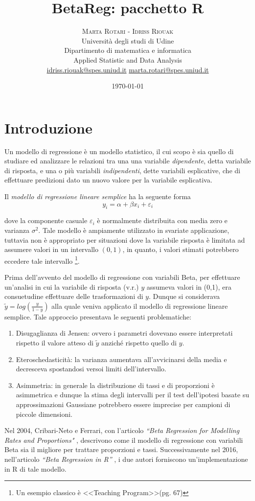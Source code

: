 \documentclass[twoside,twocolumn]{article}
\title{BetaReg: pacchetto R}
\author{
	\textsc{Marta Rotari - Idriss Riouak} \\[1ex] 
	\normalsize Università degli studi di Udine \\ 
	\normalsize Dipartimento di matematica e informatica \\ 
	\normalsize Applied Statistic and Data Analysis\\
	\normalsize \href{mailto:idriss.riouak@spes.uniud.it}{idriss.riouak@spes.uniud.it} 
	\normalsize \href{mailto:marta.rotari@spes.uniud.it}{marta.rotari@spes.uniud.it} 
}
\date{\today}
\begin{document}
	

	\maketitle
	
	\section{Introduzione}
	Un modello di regressione è un modello statistico, il cui scopo è sia quello di studiare ed analizzare le relazioni tra una una variabile \emph{dipendente}, detta variabile di risposta, e una o più variabili \emph{indipendenti}, dette variabili esplicative, che di effettuare predizioni dato un nuovo valore per la variabile esplicativa.
	
	Il \emph{modello di regressione lineare semplice} ha la seguente forma
	\begin{equation}\label{eq:lrm}
		 y_i=\alpha + \beta x_i + \varepsilon_i 
	\end{equation}

	dove la componente casuale $\varepsilon_i$ è normalmente distribuita con media zero e varianza $\sigma^2$.
	Tale modello è ampiamente utilizzato in svariate applicazione, tuttavia non è appropriato per situazioni dove la variabile risposta è limitata ad assumere valori in un intervallo $(0,1)$, in quanto, i valori stimati potrebbero eccedere tale intervallo \footnote{Un esempio classico è <<Teaching Program>>\cite{PV}(pg. 67)}. 
	
	Prima dell'avvento del modello di regressione con variabili Beta, per effettuare un'analisi in cui la variabile di risposta (v.r.) $y$ assumeva valori in (0,1), era consuetudine effettuare delle trasformazioni di $y$. Dunque si considerava $\tilde{y}=log(\frac{y}{1-y})$ alla quale veniva applicato il modello di regressione lineare semplice. Tale approccio presentava le seguenti problematiche:
	\begin{enumerate}[label=\Roman*]
		\item Disugaglianza di Jensen: ovvero i parametri dovevano essere interpretati rispetto il valore atteso di $\tilde{y}$ anziché rispetto quello di $y$.
		\item Eteroschedasticità: la varianza aumentava all'avvicinarsi della media e decresceva spostandosi versoi limiti dell'intervallo.
		\item Asimmetria: in generale la distribuzione di tassi e di proporzioni è asimmetrica e dunque la stima degli intervalli per il test dell'ipotesi basate su approssimazioni Gaussiane potrebbero essere imprecise per campioni di piccole dimensioni.
	\end{enumerate}
	Nel 2004, Cribari-Neto e Ferrari, con l'articolo \emph{``Beta Regression for Modelling Rates and Proportions"} \cite{2004}, descrivono come il modello di regressione con variabili Beta sia il migliore per trattare proporzioni e tassi. Successivamente nel 2016, nell'articolo \emph{``Beta Regression in R''} \cite{CNF}, i due autori forniscono un'implementazione in R di tale modello.
	
\end{document}
